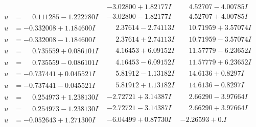 \documentclass[1p]{elsarticle_modified}
\theoremstyle{definition}
\begin{document}
$$\begin{array}{c|c|c}
 & -3.02800 + 1.82177 I & \phantom{-}4.52707 - 4.00785 I \\ \hline\begin{aligned}
u &= \phantom{-}0.111285 - 1.222780 I\end{aligned}
 & -3.02800 - 1.82177 I & \phantom{-}4.52707 + 4.00785 I \\ \hline\begin{aligned}
u &= -0.332008 + 1.184600 I\end{aligned}
 & \phantom{-}2.37614 - 2.74113 I & \phantom{-}10.71959 + 3.57074 I \\ \hline\begin{aligned}
u &= -0.332008 - 1.184600 I\end{aligned}
 & \phantom{-}2.37614 + 2.74113 I & \phantom{-}10.71959 - 3.57074 I \\ \hline\begin{aligned}
u &= \phantom{-}0.735559 + 0.086101 I\end{aligned}
 & \phantom{-}4.16453 + 6.09152 I & \phantom{-}11.57779 - 6.23652 I \\ \hline\begin{aligned}
u &= \phantom{-}0.735559 - 0.086101 I\end{aligned}
 & \phantom{-}4.16453 - 6.09152 I & \phantom{-}11.57779 + 6.23652 I \\ \hline\begin{aligned}
u &= -0.737441 + 0.045521 I\end{aligned}
 & \phantom{-}5.81912 - 1.13182 I & \phantom{-}14.6136 + 0.8297 I \\ \hline\begin{aligned}
u &= -0.737441 - 0.045521 I\end{aligned}
 & \phantom{-}5.81912 + 1.13182 I & \phantom{-}14.6136 - 0.8297 I \\ \hline\begin{aligned}
u &= \phantom{-}0.254973 + 1.238130 I\end{aligned}
 & -2.72721 + 3.14387 I & \phantom{-}2.66290 - 3.97664 I \\ \hline\begin{aligned}
u &= \phantom{-}0.254973 - 1.238130 I\end{aligned}
 & -2.72721 - 3.14387 I & \phantom{-}2.66290 + 3.97664 I \\ \hline\begin{aligned}
u &= -0.052643 + 1.271300 I\end{aligned}
 & -6.04499 + 0.87730 I & -2.26593 + 0. I\phantom{ +0.000000I} \\ \hline\begin{aligned}

\end{aligned}
\end{array}$$
\end{document}
